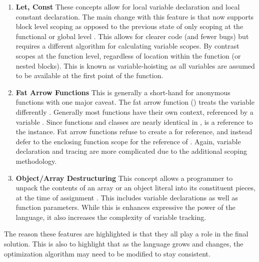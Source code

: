   \begin{enumerate}
    \item \textbf{Let, Const} These concepts allow for local variable declaration and local constant declaration.  The main change with this feature is that \javascript now supports block level scoping as opposed to the previous state of only scoping at the functional or global level \cite{let16} \cite{const16}.  This allows for clearer code (and fewer bugs) but requires a different algorithm for calculating variable scopes.  By contrast  scopes at the function level, regardless of location within the function (or nested blocks).  This is known as variable-hoisting as all variables are assumed to be available at the first point of the function.
    \item \textbf{Fat Arrow Functions} This is generally a short-hand for anonymous functions with one major caveat.  The fat arrow function () treats the  variable differently \cite{arrowfn16}.  Generally most functions have their own context, referenced by a variable .  Since functions and classes are nearly identical in \javascript,  is a reference to the instance.  Fat arrow functions refuse to create a  for reference, and instead defer to the enclosing function scope for the reference of . Again, variable declaration and tracing are more complicated due to the additional scoping methodology.
    \item \textbf{Object/Array Destructuring}  This concept allows a programmer to unpack the contents of an array or an object literal into its constituent pieces, at the time of assignment \cite{destructuring16}.  This includes variable declarations as well as function parameters.  While this is enhances expressive the power of the language, it also increases the complexity of variable tracking.  
  \end{enumerate}

The reason these features are highlighted is that they all play a role in the final solution.  This is also to highlight that as the language grows and changes, the optimization algorithm may need to be modified to stay consistent. 